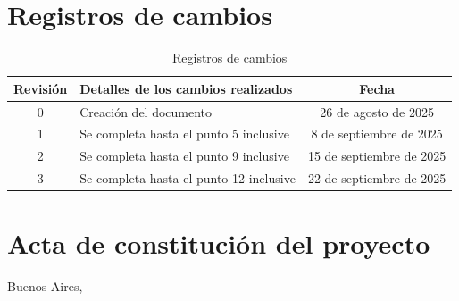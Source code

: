 \documentclass[
11pt, %
]{charter}
\begin{document}
\maketitle
\thispagestyle{empty}
\pagebreak


\thispagestyle{empty}
{\setlength{\parskip}{0pt}
\tableofcontents{}
}
\pagebreak


\section*{Registros de cambios}
\label{sec:registro}


\begin{table}[ht]
\centering
\caption{Registros de cambios}
\label{tab:registro}
\begin{tabularx}{\linewidth}{|c|X|c|}
\hline
\rowcolor[HTML]{C0C0C0} 
Revisión & Detalles de los cambios realizados & Fecha \\ \hline
0 & Creación del documento & 26 de agosto de 2025 \\ \hline
1 & Se completa hasta el punto 5 inclusive & 8 de septiembre de 2025 \\ \hline
2 & Se completa hasta el punto 9 inclusive & 15 de septiembre de 2025 \\ \hline
3 & Se completa hasta el punto 12 inclusive & 22 de septiembre de 2025 \\ \hline
\end{tabularx}
\end{table}
\pagebreak

\pagebreak



\section*{Acta de constitución del proyecto}
\label{sec:acta}

\begin{flushright}
Buenos Aires, \fechaInicioName
\end{flushright}

\vspace{2cm}
\end{document}
